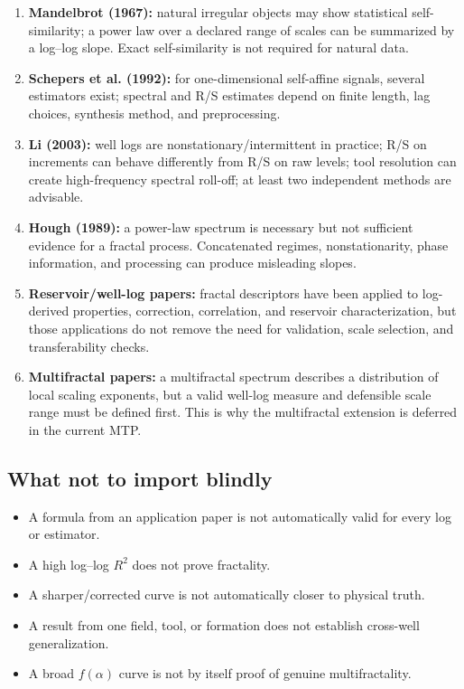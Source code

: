 \documentclass[11pt,a4paper]{article}
\begin{document}
\begin{enumerate}
\item \textbf{Mandelbrot (1967):} natural irregular objects may show statistical self-similarity; a power law over a declared range of scales can be summarized by a log--log slope. Exact self-similarity is not required for natural data.
\item \textbf{Schepers et al. (1992):} for one-dimensional self-affine signals, several estimators exist; spectral and R/S estimates depend on finite length, lag choices, synthesis method, and preprocessing.
\item \textbf{Li (2003):} well logs are nonstationary/intermittent in practice; R/S on increments can behave differently from R/S on raw levels; tool resolution can create high-frequency spectral roll-off; at least two independent methods are advisable.
\item \textbf{Hough (1989):} a power-law spectrum is necessary but not sufficient evidence for a fractal process. Concatenated regimes, nonstationarity, phase information, and processing can produce misleading slopes.
\item \textbf{Reservoir/well-log papers:} fractal descriptors have been applied to log-derived properties, correction, correlation, and reservoir characterization, but those applications do not remove the need for validation, scale selection, and transferability checks.
\item \textbf{Multifractal papers:} a multifractal spectrum describes a distribution of local scaling exponents, but a valid well-log measure and defensible scale range must be defined first. This is why the multifractal extension is deferred in the current MTP.
\end{enumerate}

\subsection{What not to import blindly}
\begin{itemize}
\item A formula from an application paper is not automatically valid for every log or estimator.
\item A high log--log $R^2$ does not prove fractality.
\item A sharper/corrected curve is not automatically closer to physical truth.
\item A result from one field, tool, or formation does not establish cross-well generalization.
\item A broad $f(\alpha)$ curve is not by itself proof of genuine multifractality.
\end{itemize}
\end{document}
